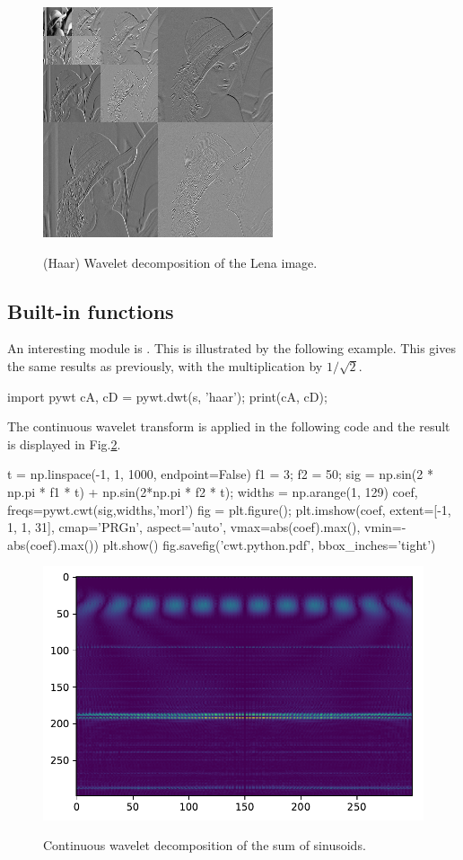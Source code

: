 \begin{figure}[H]
 \centering\caption{(Haar) Wavelet decomposition of the Lena image.}%
 \includegraphics[width=.5\linewidth]{lena_wavelets_3.python.png}%
 \label{fig:wavelets:python:lena_lvl}%
\end{figure}


\subsection{Built-in functions}
An interesting module is . This is illustrated by the following example. This gives the same results as previously, with the multiplication by $1/\sqrt{2}$.
\begin{python}
import pywt
cA, cD = pywt.dwt(s, 'haar');
print(cA, cD);
\end{python}

\begin{sh}
[ 8.48528137  3.53553391 16.26345597 27.57716447] 
[-2.82842712 -0.70710678 -9.19238816 -0.70710678]
\end{sh}

The continuous wavelet transform is applied in the following code and the result is displayed in Fig.\ref{fig:wavelets:python:cwt}.

\begin{python}
t = np.linspace(-1, 1, 1000, endpoint=False)
f1 =  3;
f2 = 50;
sig  = np.sin(2 * np.pi * f1 * t) + np.sin(2*np.pi * f2 * t);
widths = np.arange(1, 129)
coef, freqs=pywt.cwt(sig,widths,'morl')
fig = plt.figure();
plt.imshow(coef, extent=[-1, 1, 1, 31], cmap='PRGn', aspect='auto',
           vmax=abs(coef).max(), vmin=-abs(coef).max())  
plt.show() 
fig.savefig('cwt.python.pdf', bbox_inches='tight')
\end{python}

\begin{figure}[H]
 \centering\caption{Continuous wavelet decomposition of the sum of sinusoids.}%
 \includegraphics[width=.7\linewidth]{cwt.python.pdf}%
 \label{fig:wavelets:python:cwt}%
\end{figure}
